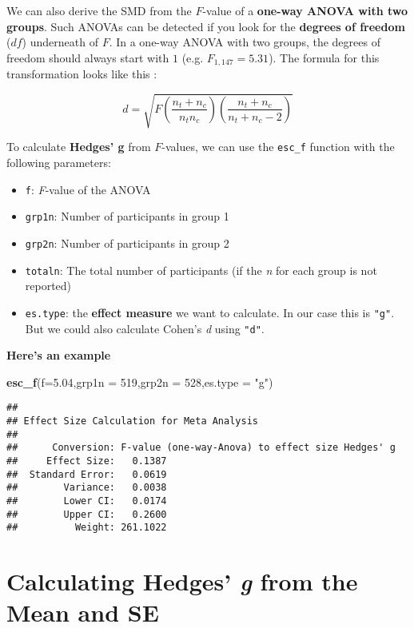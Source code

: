 \documentclass[]{book}
\newenvironment{Shaded}{\begin{snugshade}}{\end{snugshade}}
\newcommand{\KeywordTok}[1]{\textcolor[rgb]{0.13,0.29,0.53}{\textbf{#1}}}
\newcommand{\DataTypeTok}[1]{\textcolor[rgb]{0.13,0.29,0.53}{#1}}
\newcommand{\DecValTok}[1]{\textcolor[rgb]{0.00,0.00,0.81}{#1}}
\newcommand{\FloatTok}[1]{\textcolor[rgb]{0.00,0.00,0.81}{#1}}
\newcommand{\StringTok}[1]{\textcolor[rgb]{0.31,0.60,0.02}{#1}}
\newcommand{\NormalTok}[1]{#1}
\providecommand{\tightlist}{%
  \setlength{\itemsep}{0pt}\setlength{\parskip}{0pt}}
\theoremstyle{definition}
\theoremstyle{definition}
\theoremstyle{definition}
\theoremstyle{remark}
\begin{document}
We can also derive the SMD from the \(F\)-value of a \textbf{one-way
ANOVA with two groups}. Such ANOVAs can be detected if you look for the
\textbf{degrees of freedom} (\(df\)) underneath of \(F\). In a one-way
ANOVA with two groups, the degrees of freedom should always start with
\(1\) (e.g. \(F_{1,147}=5.31\)). The formula for this transformation
looks like this
\citep{cohen1992power, rosnow1996computing, rosnow2000contrasts}:

\[d = \sqrt{  F(\frac{n_t+n_c}{n_t n_c})(\frac{n_t+n_c}{n_t+n_c-2})}\]

To calculate \textbf{Hedges' g} from \(F\)-values, we can use the
\texttt{esc\_f} function with the following parameters:

\begin{itemize}
\tightlist
\item
  \texttt{f}: \emph{F}-value of the ANOVA
\item
  \texttt{grp1n}: Number of participants in group 1
\item
  \texttt{grp2n}: Number of participants in group 2
\item
  \texttt{totaln}: The total number of participants (if the \emph{n} for
  each group is not reported)
\item
  \texttt{es.type}: the \textbf{effect measure} we want to calculate. In
  our case this is \texttt{"g"}. But we could also calculate Cohen's
  \emph{d} using \texttt{"d"}.
\end{itemize}

\textbf{Here's an example}

\begin{Shaded}
\begin{Highlighting}[]
\KeywordTok{esc_f}\NormalTok{(}\DataTypeTok{f=}\FloatTok{5.04}\NormalTok{,}\DataTypeTok{grp1n =} \DecValTok{519}\NormalTok{,}\DataTypeTok{grp2n =} \DecValTok{528}\NormalTok{,}\DataTypeTok{es.type =} \StringTok{"g"}\NormalTok{)}
\end{Highlighting}
\end{Shaded}

\begin{verbatim}
## 
## Effect Size Calculation for Meta Analysis
## 
##      Conversion: F-value (one-way-Anova) to effect size Hedges' g
##     Effect Size:   0.1387
##  Standard Error:   0.0619
##        Variance:   0.0038
##        Lower CI:   0.0174
##        Upper CI:   0.2600
##          Weight: 261.1022
\end{verbatim}

\hypertarget{e}{\section{\texorpdfstring{Calculating Hedges' \emph{g}
from the Mean and
SE}{Calculating Hedges' g from the Mean and SE}}\label{e}}
\end{document}
